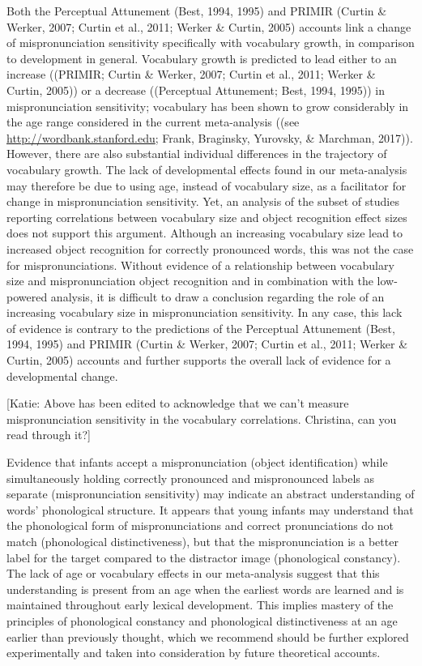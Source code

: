 \documentclass[man]{apa6}
\theoremstyle{definition}
\theoremstyle{definition}
\theoremstyle{definition}
\theoremstyle{remark}
\begin{document}
Both the Perceptual Attunement (Best, 1994, 1995) and PRIMIR (Curtin \&
Werker, 2007; Curtin et al., 2011; Werker \& Curtin, 2005) accounts link
a change of mispronunciation sensitivity specifically with vocabulary
growth, in comparison to development in general. Vocabulary growth is
predicted to lead either to an increase ((PRIMIR; Curtin \& Werker,
2007; Curtin et al., 2011; Werker \& Curtin, 2005)) or a decrease
((Perceptual Attunement; Best, 1994, 1995)) in mispronunciation
sensitivity; vocabulary has been shown to grow considerably in the age
range considered in the current meta-analysis ((see
\url{http://wordbank.stanford.edu}; Frank, Braginsky, Yurovsky, \&
Marchman, 2017)). However, there are also substantial individual
differences in the trajectory of vocabulary growth. The lack of
developmental effects found in our meta-analysis may therefore be due to
using age, instead of vocabulary size, as a facilitator for change in
mispronunciation sensitivity. Yet, an analysis of the subset of studies
reporting correlations between vocabulary size and object recognition
effect sizes does not support this argument. Although an increasing
vocabulary size lead to increased object recognition for correctly
pronounced words, this was not the case for mispronunciations. Without
evidence of a relationship between vocabulary size and mispronunciation
object recognition and in combination with the low-powered analysis, it
is difficult to draw a conclusion regarding the role of an increasing
vocabulary size in mispronunciation sensitivity. In any case, this lack
of evidence is contrary to the predictions of the Perceptual Attunement
(Best, 1994, 1995) and PRIMIR (Curtin \& Werker, 2007; Curtin et al.,
2011; Werker \& Curtin, 2005) accounts and further supports the overall
lack of evidence for a developmental change.

{[}Katie: Above has been edited to acknowledge that we can't measure
mispronunciation sensitivity in the vocabulary correlations. Christina,
can you read through it?{]}

Evidence that infants accept a mispronunciation (object identification)
while simultaneously holding correctly pronounced and mispronounced
labels as separate (mispronunciation sensitivity) may indicate an
abstract understanding of words' phonological structure. It appears that
young infants may understand that the phonological form of
mispronunciations and correct pronunciations do not match (phonological
distinctiveness), but that the mispronunciation is a better label for
the target compared to the distractor image (phonological constancy).
The lack of age or vocabulary effects in our meta-analysis suggest that
this understanding is present from an age when the earliest words are
learned and is maintained throughout early lexical development. This
implies mastery of the principles of phonological constancy and
phonological distinctiveness at an age earlier than previously thought,
which we recommend should be further explored experimentally and taken
into consideration by future theoretical accounts.
\end{document}
